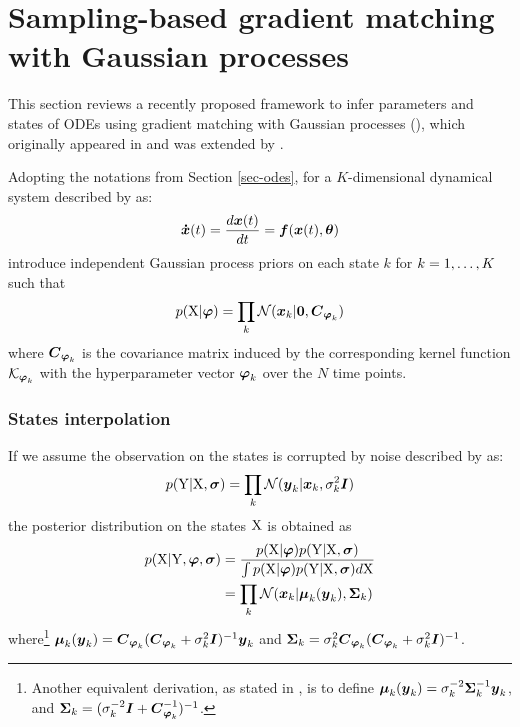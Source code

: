 \section{Sampling-based gradient matching with Gaussian processes}
\label{sec-sampling-gradient-matching}

This section reviews a recently proposed framework to infer parameters and states of ODEs using gradient matching with Gaussian processes (\algogmgp), which originally appeared in \cite{calderhead2009accelerating} and was extended by \cite{dondelinger2013ode}.

Adopting the notations from Section \ref{sec-odes}, for a $K$-dimensional dynamical system described by  as:
\begin{align}
    \boldsymbol{\dot{x}}(t) = \frac{d\boldsymbol{x}(t)}{dt} = \boldsymbol{f}(\boldsymbol{x}(t), \boldsymbol{\theta})
    \label{eq-gmgp-odes}
\end{align}
\cite{calderhead2009accelerating} introduce independent Gaussian process priors on each state $k$ for $k = 1,\dots,K$ such that 
\begin{align}
    p(\mathrm{X}\vert\boldsymbol{\varphi}) 
    = \prod_k{
        \mathcal{N}(
        \boldsymbol{x}_{k}\vert\boldsymbol{0}, \boldsymbol{C}_{\boldsymbol{\varphi}_{k}})
    }
    \label{eq-gmgp-x-prior}
\end{align}
where $\boldsymbol{C}_{\boldsymbol{\varphi}_{k}}$ is the covariance matrix induced by the corresponding kernel function $\mathcal{K}_{\boldsymbol{\varphi}_{k}}$ with the hyperparameter vector $\boldsymbol{\varphi}_{k}$ over the $N$ time points.

\subsubsection*{States interpolation}

If we assume the observation on the states is corrupted by noise described by  as:
\begin{align}
    p(\mathrm{Y}\vert\mathrm{X},\boldsymbol{\sigma}) 
    = \prod_k{
        \mathcal{N}(
        \boldsymbol{y}_{k}\vert\boldsymbol{x}_{k}, \sigma_{k}^2\boldsymbol{I})
    }
    \label{eq-gmpg-noise-model}
\end{align}
the posterior distribution on the states $\mathrm{X}$ is obtained as 
\begin{align}
    p(\mathrm{X}\vert\mathrm{Y},\boldsymbol{\varphi},\boldsymbol{\sigma}) 
    & = \frac{
        p(\mathrm{X}\vert\boldsymbol{\varphi})p(\mathrm{Y}\vert\mathrm{X},\boldsymbol{\sigma})}{
        \int{
            p(\mathrm{X}\vert\boldsymbol{\ensuremath{\varphi}})p(\mathrm{Y}\vert\mathrm{X},\boldsymbol{\sigma})d{\mathrm{X}}}
    }
    \nonumber
    \\
    & = \prod_k{
        \mathcal{N}(
        \boldsymbol{x}_{k}\vert\boldsymbol{\mu}_{k}(\boldsymbol{y}_{k}), \boldsymbol{\Sigma}_{k})
    }
    \label{eq-gmgp-x-posterior}
\end{align}
where\footnote{Another equivalent derivation, as stated in \cite{gorbach2017scalable}, is to define $\boldsymbol{\mu}_{k}(\boldsymbol{y}_{k}) = \sigma_{k}^{-2}\boldsymbol{\Sigma}_{k}^{-1}\boldsymbol{y}_{k}$, and $\boldsymbol{\Sigma}_{k} = (\sigma_{k}^{-2}\boldsymbol{I} + \boldsymbol{C}_{\boldsymbol{\varphi}_{k}}^{-1})^{-1}$.} $\boldsymbol{\mu}_{k}(\boldsymbol{y}_{k}) = \boldsymbol{C}_{\boldsymbol{\varphi}_{k}}(\boldsymbol{C}_{\boldsymbol{\varphi}_{k}} + \sigma_{k}^2\boldsymbol{I})^{-1}\boldsymbol{y}_{k}$ and $\boldsymbol{\Sigma}_{k} = \sigma_{k}^2\boldsymbol{C}_{\boldsymbol{\varphi}_{k}}(\boldsymbol{C}_{\boldsymbol{\varphi}_{k}} + \sigma_{k}^2\boldsymbol{I})^{-1}$.

